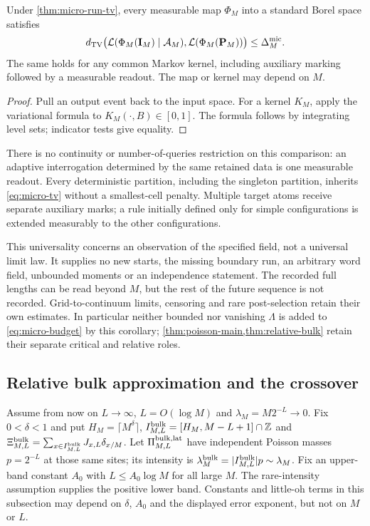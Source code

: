 

\begin{corollary}
\label{cor:micro-readout}
Under \cref{thm:micro-run-tv}, every measurable map $\Phi_M$ into a
standard Borel space satisfies
\begin{equation}\label{eq:micro-readout}
 d_{\mathrm{TV}}\bigl(\mathcal L(\Phi_M(\mathbf I_M)\mid\mathcal A_M),
                    \mathcal L(\Phi_M(\mathbf P_M))\bigr)\le\Delta_M^{\rm mic}.
\end{equation}
The same holds for any common Markov kernel, including auxiliary marking
followed by a measurable readout. The map or kernel may depend on $M$.
\end{corollary}
\begin{proof}
Pull an output event back to the input space. For a kernel $K_M$, apply
the variational formula to $K_M(\cdot,B)\in[0,1]$. The formula follows
by integrating level sets; indicator tests give equality.
\end{proof}
There is no continuity or number-of-queries restriction on this
comparison: an adaptive interrogation determined by the same retained
data is one measurable readout. Every deterministic partition, including
the singleton partition, inherits \eqref{eq:micro-tv} without a smallest-cell
penalty. Multiple target atoms receive separate auxiliary marks; a rule
initially defined only for simple configurations is extended measurably
to the other configurations.

This universality concerns an observation of the specified field, not a
universal limit law. It supplies no new starts, the missing boundary run,
an arbitrary word field, unbounded moments or an independence statement.
The recorded full lengths can be read beyond $M$, but the rest of the
future sequence is not recorded. Grid-to-continuum limits, censoring and
rare post-selection retain their own estimates. In particular neither
bounded nor vanishing $\Lambda$ is added to \eqref{eq:micro-budget} by this
corollary; \cref{thm:poisson-main,thm:relative-bulk} retain their separate
critical and relative roles.



\subsection{Relative bulk approximation and the crossover}
Assume from now on $L\to\infty$, $L=O(\log M)$ and
$\lambda_M=M2^{-L}\to0$. Fix $0<\delta<1$ and put
$H_M=\lceil M^\delta\rceil$,
$I^{\rm bulk}_{M,L}=[H_M,M-L+1]\cap\mathbb Z$ and
$\Xi^{\rm bulk}_{M,L}=\sum_{x\in I^{\rm bulk}_{M,L}}J_{x,L}\delta_{x/M}$.
Let $\Pi^{\rm bulk,lat}_{M,L}$ have independent Poisson masses $p=2^{-L}$
at those same sites; its intensity is
$\lambda_M^{\rm bulk}=|I^{\rm bulk}_{M,L}|p\sim\lambda_M$.
Fix an upper-band constant $A_0$ with $L\le A_0\log M$ for all large
$M$. The rare-intensity assumption supplies the positive lower band.
Constants and little-oh terms in this subsection may depend on
$\delta$, $A_0$ and the displayed error exponent, but not on $M$ or $L$.

